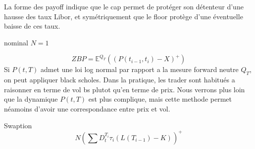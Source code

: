 La forme des payoff indique que le cap permet de protéger son détenteur d’une hausse des taux Libor, et symétriquement que le floor protège d’une éventuelle baisse de ces taux.

nominal $N = 1$

$$ZBP = \mathbb{E}^{Q_T}(  (P(t_{i-1}, t_i) - X)^+ )$$
Si $P(t, T)$ admet une loi log normal par rapport a la mesure forward neutre $Q_T$, on peut appliquer black scholes. Dans la pratique, les trader sont habitués a raisonner en terme de vol bs plutot qu'en terme de prix. Nous verrons plus loin que la dynamique $P(t, T)$ est plus complique, mais cette methode permet néamoins d'avoir une correspondance entre prix et vol.


\begin{defn}
Swaption
$$ N (\sum D_t^{T_i} \tau_i (L(T_{i-1}) - K))^+ $$
\end{defn}

